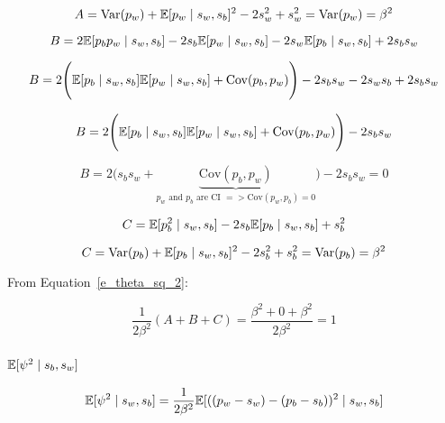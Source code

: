 \documentclass[a4paper,11pt]{article}
\theoremstyle{mytheor}
\newcommand{\E}{\Bbb{E}}
\newcommand{\Var}{\mathrm{Var}}
\newcommand{\Cov}{\mathrm{Cov}}
\begin{document}
\begin{equation}
    \label{e_theta_sq_2_a_1}
    A=\Var(p_w)+\E[p_w\mid s_w,s_b]^2 - 2s_w^2 + s_{w}^{2} = \Var(p_w) = \beta^2
\end{equation}

\begin{equation}
    \label{e_theta_sq_2_b}
    B=2\E[p_bp_w \mid s_w,s_b] - 2s_b\E[p_w \mid s_w,s_b] - 2s_w\E[p_b \mid s_w,s_b] + 2s_bs_w
\end{equation}

\begin{equation}
    \label{e_theta_sq_2_b_1}
    B=2 \Bigg( \E[p_b \mid s_w,s_b]\E[p_w \mid s_w,s_b] + \Cov(p_b,p_w) \Bigg) - 2s_bs_w - 2s_ws_b + 2s_bs_w
\end{equation}

\begin{equation}
    \label{e_theta_sq_2_b_2}
    B=2 \Bigg( \E[p_b \mid s_w,s_b]\E[p_w \mid s_w,s_b] + \Cov(p_b,p_w) \Bigg) - 2s_bs_w
\end{equation}

\begin{equation}
    \label{e_theta_sq_2_b_2}
    B=2 \Bigg( s_bs_w +  \underbrace{\Cov(p_b,p_w)}_\text{$p_w$ and $p_b$ are CI $=> \Cov(p_w,p_b)=0$} \Bigg) - 2s_bs_w=0
\end{equation}

\begin{equation}
    \label{e_theta_sq_2_c}
    C=\Bbb{E}[p_b^2\mid s_w,s_b] - 2s_b\Bbb{E}[p_b\mid s_w,s_b] + s_{b}^{2}
\end{equation}

\begin{equation}
    \label{e_theta_sq_2_c_1}
    C=\Var(p_b)+\E[p_b\mid s_w,s_b]^2 - 2s_b^2 + s_{b}^{2} = \Var(p_b) = \beta^2
\end{equation}

From Equation~\ref{e_theta_sq_2}:

\begin{equation}
    \label{e_theta_sq_all_combined}
    \frac{1}{2\beta^2}(A+B+C)=\frac{\beta^2+0+\beta^2}{2\beta^2} = 1
\end{equation}

\subsubsection{$\E[\psi^2 \mid s_b,s_w]$}

\begin{equation}
    \label{e_psi_sq}
    \Bbb{E}[\psi^2\mid s_w,s_b] = \frac{1}{2\beta^2}\Bbb{E}[((p_w-s_w)-(p_b-s_b))^2 \mid s_w,s_b]
\end{equation}
\end{document}

